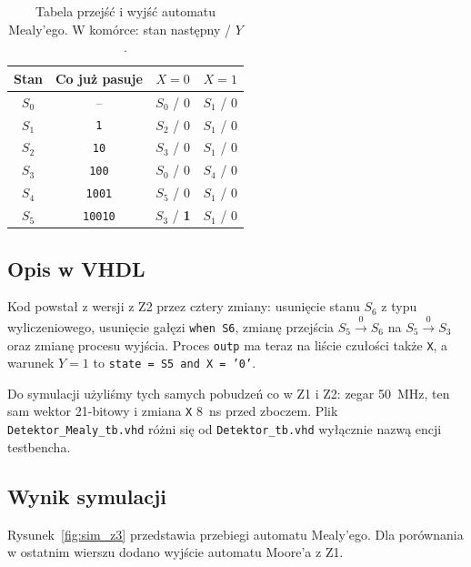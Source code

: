 \documentclass[11pt,a4paper]{article}
\begin{document}
\begin{table}[H]
\centering
\small
\begin{tabular}{cccc}
\toprule
Stan & Co już pasuje & $X = 0$ & $X = 1$\\
\midrule
$S_0$ & -- & $S_0$ / 0 & $S_1$ / 0\\
$S_1$ & \texttt{1} & $S_2$ / 0 & $S_1$ / 0\\
$S_2$ & \texttt{10} & $S_3$ / 0 & $S_1$ / 0\\
$S_3$ & \texttt{100} & $S_0$ / 0 & $S_4$ / 0\\
$S_4$ & \texttt{1001} & $S_5$ / 0 & $S_1$ / 0\\
$S_5$ & \texttt{10010} & \cellcolor{pwr!18}$S_3$ / \textbf{1} & $S_1$ / 0\\
\bottomrule
\end{tabular}
\caption{Tabela przejść i wyjść automatu Mealy'ego. W komórce: stan następny / $Y$.}
\label{tab:mealy}
\end{table}

\subsection{Opis w VHDL}

Kod powstał z wersji z Z2 przez cztery zmiany: usunięcie stanu $S_6$ z typu wyliczeniowego, usunięcie gałęzi \texttt{when S6}, zmianę przejścia $S_5 \xrightarrow{0} S_6$ na $S_5 \xrightarrow{0} S_3$ oraz zmianę procesu wyjścia. Proces \texttt{outp} ma teraz na liście czułości także \texttt{X}, a warunek $Y = 1$ to \texttt{state = S5 and X = '0'}.



Do symulacji użyliśmy tych samych pobudzeń co w Z1 i Z2: zegar 50~MHz, ten sam wektor 21-bitowy i zmiana \texttt{X} 8~ns przed zboczem. Plik \texttt{Detektor\_Mealy\_tb.vhd} różni się od \texttt{Detektor\_tb.vhd} wyłącznie nazwą encji testbencha.

\subsection{Wynik symulacji}

Rysunek~\ref{fig:sim_z3} przedstawia przebiegi automatu Mealy'ego. Dla porównania w ostatnim wierszu dodano wyjście automatu Moore'a z Z1.
\end{document}
